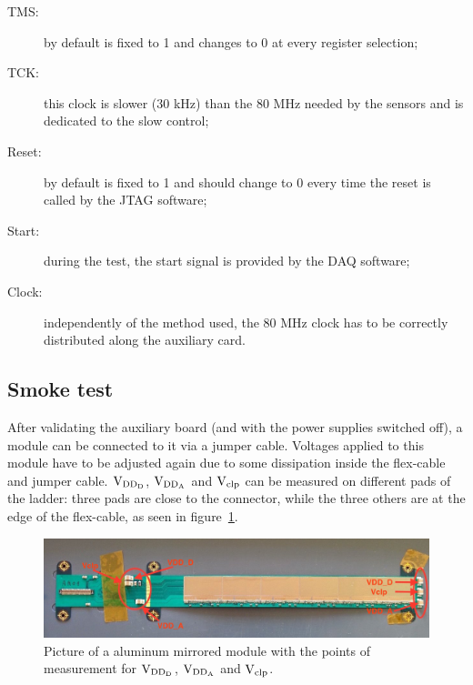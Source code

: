   \begin{description}
    \item[\gls{TMS}:] by default is fixed to 1 and changes to 0 at every register selection;
    \item[\gls{TCK}:] this clock is slower (30 kHz) than the 80 MHz needed by the sensors and is dedicated to the slow control;
    \item[Reset:] by default is fixed to 1 and should change to 0 every time the reset is called by the \gls{JTAG} software;
    \item[Start:] during the test, the start signal is provided by the \gls{DAQ} software;
    \item[Clock:] independently of the method used, the 80 MHz clock has to be correctly distributed along the auxiliary card.
  \end{description}


  \subsection{Smoke test}

  After validating the auxiliary board (and with the power supplies switched off), a module can be connected to it via a jumper cable.
  Voltages applied to this module have to be adjusted again due to some dissipation inside the flex-cable and jumper cable.
  $\rm{V}_{\rm{DD_D}}$, $\rm{V}_{\rm{DD_A}}$ and $\rm{V}_{\rm{clp}}$ can be measured on different pads of the ladder: three pads are close to the connector, while the three others are at the edge of the flex-cable, as seen in figure~\ref{fig:voltagePads}.

  \begin{figure}[!tbh]
    \centering
    \includegraphics[width=\textwidth]{Pictures/labTests/AM01_voltagePads.jpg}
    \caption{Picture of a aluminum mirrored module with the points of measurement for $\rm{V}_{\rm{DD_D}}$, $\rm{V}_{\rm{DD_A}}$ and $\rm{V}_{\rm{clp}}$.}
    \label{fig:voltagePads}
  \end{figure}

